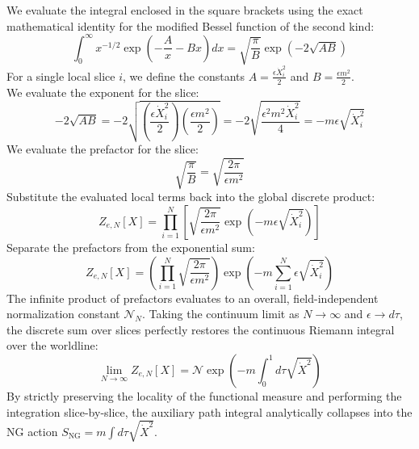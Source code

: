 \begin{tcolorbox}[breakable]
	We evaluate the integral enclosed in the square brackets using the exact mathematical identity for the modified Bessel function of the second kind:
	\begin{equation}
		\int_{0}^{\infty} x^{-1/2} \exp\left(-\frac{A}{x} - Bx\right) dx = \sqrt{\frac{\pi}{B}} \exp\left(-2\sqrt{AB}\right)
	\end{equation}
	For a single local slice $i$, we define the constants $A = \frac{\epsilon \dot{X}_i^2}{2}$ and $B = \frac{\epsilon m^2}{2}$.\\
	We evaluate the exponent for the slice:
	\begin{equation}
		-2\sqrt{AB} = -2 \sqrt{ \left(\frac{\epsilon \dot{X}_i^2}{2}\right) \left(\frac{\epsilon m^2}{2}\right) } = -2 \sqrt{ \frac{\epsilon^2 m^2 \dot{X}_i^2}{4} } = -m \epsilon \sqrt{\dot{X}_i^2}
	\end{equation}
	We evaluate the prefactor for the slice:
	\begin{equation}
		\sqrt{\frac{\pi}{B}} = \sqrt{\frac{2\pi}{\epsilon m^2}}
	\end{equation}
	Substitute the evaluated local terms back into the global discrete product:
	\begin{equation}
		Z_{e, N}[X] = \prod_{i=1}^N \left[ \sqrt{\frac{2\pi}{\epsilon m^2}} \exp\left( -m \epsilon \sqrt{\dot{X}_i^2} \right) \right]
	\end{equation}
	Separate the prefactors from the exponential sum:
	\begin{equation}
		Z_{e, N}[X] = \left( \prod_{i=1}^N \sqrt{\frac{2\pi}{\epsilon m^2}} \right) \exp\left( -m \sum_{i=1}^N \epsilon \sqrt{\dot{X}_i^2} \right)
	\end{equation}
	The infinite product of prefactors evaluates to an overall, field-independent normalization constant $\mathcal{N}_N$. Taking the continuum limit as $N \to \infty$ and $\epsilon \to d\tau$, the discrete sum over slices perfectly restores the continuous Riemann integral over the worldline:
	\begin{equation}
		\lim_{N \to \infty} Z_{e, N}[X] = \mathcal{N} \exp\left( -m \int_{0}^{1} d\tau \sqrt{\dot{X}^2} \right)
	\end{equation}
	By strictly preserving the locality of the functional measure and performing the integration slice-by-slice, the auxiliary path integral analytically collapses into the NG action $S_{\text{NG}} = m \int d\tau \sqrt{\dot{X}^2}$. 
\end{tcolorbox}
  
